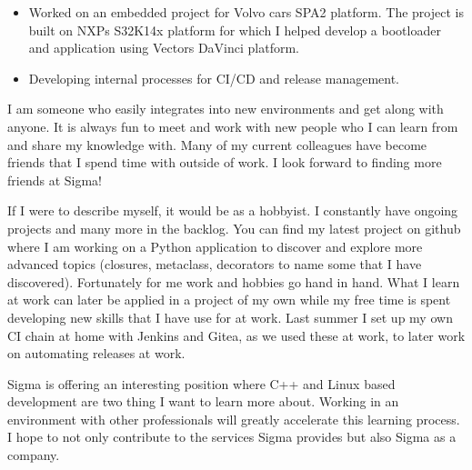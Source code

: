 \documentclass[10pt,a4paper,ragged2e,withhyper]{altacv}
\begin{document}
\begin{paracol}{2}

\begin{itemize}
\item Worked on an embedded project for Volvo cars SPA2 platform. The project is 
built on NXPs S32K14x platform for which I helped develop a bootloader and application using Vectors 
DaVinci platform.
\item Developing internal processes for CI/CD and release management. 
\end{itemize}


I am someone who easily integrates into new environments and get along with anyone. 
It is always fun to meet and work with new people who I can learn from and share my knowledge with.
Many of my current colleagues have become friends that I spend time with outside of work. I look
forward to finding more friends at Sigma!
\smallskip

If I were to describe myself, it would be as a hobbyist. I constantly have ongoing projects and many more in
the backlog. You can find my latest project on github where I am working on a Python application to 
discover and explore more advanced topics (closures, metaclass, decorators to name some that I have discovered).
Fortunately for me work and hobbies go hand in hand. What I learn at work can later be applied in a project 
of my own while my free time is spent developing new skills that I have use for at work. Last summer 
I set up my own CI chain at home with Jenkins and Gitea, as we used these at work, to later work on 
automating releases at work.
\smallskip

Sigma is offering an interesting position where C++ and Linux based development are two thing I want to
learn more about. Working in an environment with other professionals will greatly accelerate this learning 
process. I hope to not only contribute to the services Sigma provides but also Sigma as a company.

\medskip


\switchcolumn


\end{paracol}
\end{document}
